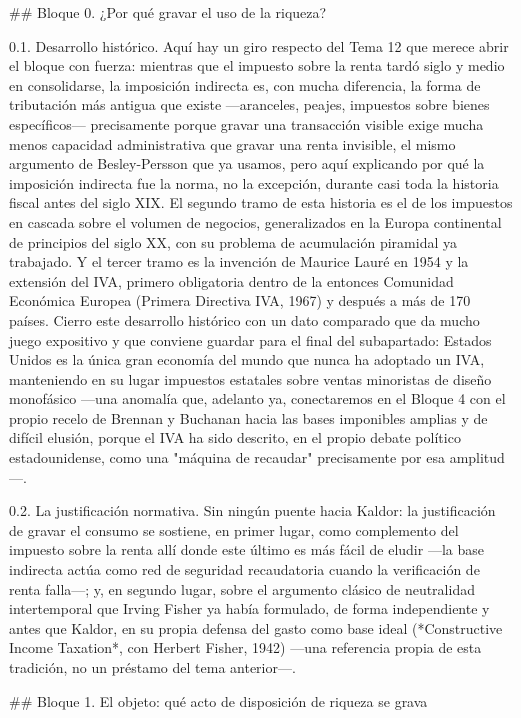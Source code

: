 \documentclass[10pt,a4paper]{article}
\begin{document}
## Bloque 0. ¿Por qué gravar el uso de la riqueza?

0.1. Desarrollo histórico. Aquí hay un giro respecto del Tema 12 que merece abrir el bloque con fuerza: mientras que el impuesto sobre la renta tardó siglo y medio en consolidarse, la imposición indirecta es, con mucha diferencia, la forma de tributación más antigua que existe —aranceles, peajes, impuestos sobre bienes específicos— precisamente porque gravar una transacción visible exige mucha menos capacidad administrativa que gravar una renta invisible, el mismo argumento de Besley-Persson que ya usamos, pero aquí explicando por qué la imposición indirecta fue la norma, no la excepción, durante casi toda la historia fiscal antes del siglo XIX. El segundo tramo de esta historia es el de los impuestos en cascada sobre el volumen de negocios, generalizados en la Europa continental de principios del siglo XX, con su problema de acumulación piramidal ya trabajado. Y el tercer tramo es la invención de Maurice Lauré en 1954 y la extensión del IVA, primero obligatoria dentro de la entonces Comunidad Económica Europea (Primera Directiva IVA, 1967) y después a más de 170 países. Cierro este desarrollo histórico con un dato comparado que da mucho juego expositivo y que conviene guardar para el final del subapartado: Estados Unidos es la única gran economía del mundo que nunca ha adoptado un IVA, manteniendo en su lugar impuestos estatales sobre ventas minoristas de diseño monofásico —una anomalía que, adelanto ya, conectaremos en el Bloque 4 con el propio recelo de Brennan y Buchanan hacia las bases imponibles amplias y de difícil elusión, porque el IVA ha sido descrito, en el propio debate político estadounidense, como una "máquina de recaudar" precisamente por esa amplitud—.

0.2. La justificación normativa. Sin ningún puente hacia Kaldor: la justificación de gravar el consumo se sostiene, en primer lugar, como complemento del impuesto sobre la renta allí donde este último es más fácil de eludir —la base indirecta actúa como red de seguridad recaudatoria cuando la verificación de renta falla—; y, en segundo lugar, sobre el argumento clásico de neutralidad intertemporal que Irving Fisher ya había formulado, de forma independiente y antes que Kaldor, en su propia defensa del gasto como base ideal (*Constructive Income Taxation*, con Herbert Fisher, 1942) —una referencia propia de esta tradición, no un préstamo del tema anterior—.

## Bloque 1. El objeto: qué acto de disposición de riqueza se grava
\end{document}
